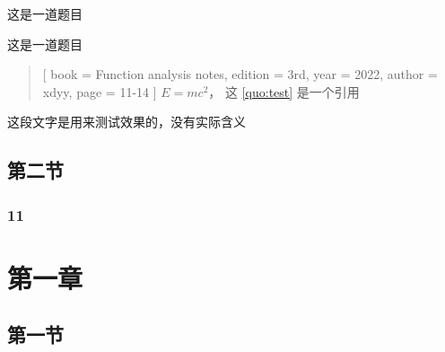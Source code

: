 \documentclass{xdyy-notes}
\begin{document}
\begin{exercise}
  这是一道题目
\end{exercise}

\begin{exercise}
  这是一道题目
\end{exercise}

\begin{quotation}[
  book = {Function analysis notes},
  edition = {3rd},
  year = {2022},
  author = {xdyy},
  page = {11-14}
]\label{quo:test}
  $E = m c^2$， 这 \ref{quo:test} 是一个引用
\end{quotation}


\begin{detail}[
  book = {《泛函分析讲义》},
  author = {许全华},
  edition = {第一版},
  year = {2017},
  page = {103},
  original = {
    \zhlipsum[1-2]
  }
]
  这段文字是用来测试效果的，没有实际含义
\end{detail}





\correction[
  book = {《摸鱼讲义》},
  author = {夏康玮},
  edition = {第一版},
  year = {2022},
  page = {88},
  original = {
    \zhlipsum[1]
  },
  revision = {
    \zhlipsum[2]
  },
  explanation = {
    无须多言
  }
]

\section{第二节}


\zhlipsum[1-6]






\subsection{11}


\zhlipsum[1-2]



\chapter{第一章}

\section{第一节}
\cite{DiophantineQueffelec}


\backmatter
\printbibliography
\end{document}
